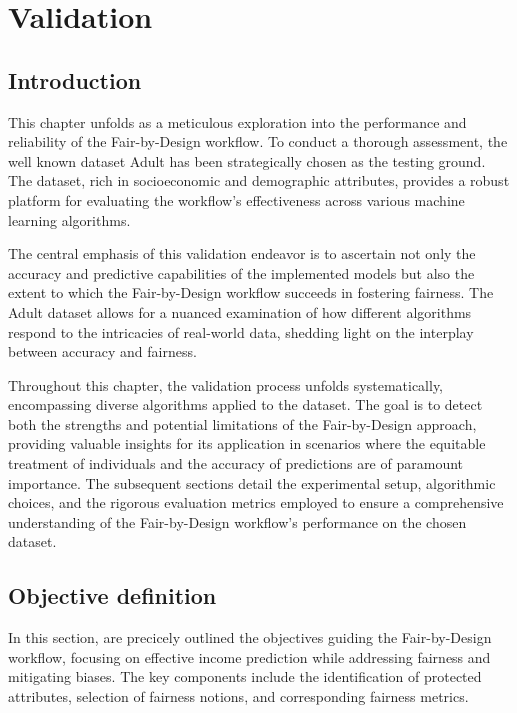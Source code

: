 \chapter{Validation}
\label{chap:validation}

\section{Introduction}

This chapter unfolds as a meticulous exploration into the performance and reliability of the Fair-by-Design workflow. To conduct a thorough assessment, the well known dataset Adult has been strategically chosen as the testing ground. The dataset, rich in socioeconomic and demographic attributes, provides a robust platform for evaluating the workflow's effectiveness across various machine learning algorithms.

The central emphasis of this validation endeavor is to ascertain not only the accuracy and predictive capabilities of the implemented models but also the extent to which the Fair-by-Design workflow succeeds in fostering fairness. The Adult dataset allows for a nuanced examination of how different algorithms respond to the intricacies of real-world data, shedding light on the interplay between accuracy and fairness.

Throughout this chapter, the validation process unfolds systematically, encompassing diverse algorithms applied to the dataset. The goal is to detect both the strengths and potential limitations of the Fair-by-Design approach, providing valuable insights for its application in scenarios where the equitable treatment of individuals and the accuracy of predictions are of paramount importance. The subsequent sections detail the experimental setup, algorithmic choices, and the rigorous evaluation metrics employed to ensure a comprehensive understanding of the Fair-by-Design workflow's performance on the chosen dataset.

\section{Objective definition}
\label{section:val_obj}

In this section, are precicely outlined the objectives guiding the Fair-by-Design workflow, focusing on effective income prediction while addressing fairness and mitigating biases. The key components include the identification of protected attributes, selection of fairness notions, and corresponding fairness metrics.

